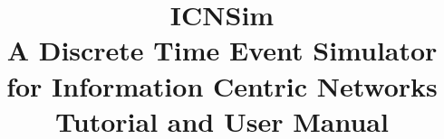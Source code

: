 \documentclass{book}
\begin{document}
\pagestyle{empty}
\title{\textbf{ICNSim} \\ A Discrete Time Event Simulator \\ for Information Centric Networks \\{\large Tutorial and User Manual}}
\maketitle

\pagestyle{fancy}

\tableofcontents


{}

\end{document}
